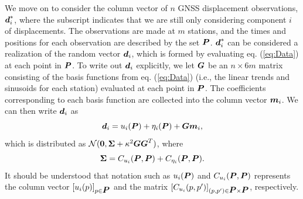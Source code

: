 \documentclass[extra,mreferee]{gji}
\begin{document}
We move on to consider the column vector of $n$ GNSS displacement observations, $\mitbf{d}^*_i$, where the subscript indicates that we are still only considering component $i$ of displacements. The observations are made at $m$ stations, and the times and positions for each observation are described by the set $\mitbf{P}$. $\mitbf{d}^*_i$ can be considered a realization of the random vector $\mitbf{d}_i$, which is formed by evaluating eq. (\ref{eq:Data}) at each point in $\mitbf{P}$. To write out $\mitbf{d}_i$ explicitly, we let $\mitbf{G}$ be an $n \times 6m$ matrix consisting of the basis functions from eq. (\ref{eq:Data}) (i.e., the linear trends and sinusoids for each station) evaluated at each point in $\mitbf{P}$. The coefficients corresponding to each basis function are collected into the column vector $\mitbf{m}_i$. We can then write $\mitbf{d}_i$ as 
\begin{equation}\label{eq:DataVec}
\mitbf{d}_i = u_i(\mitbf{P}) + \eta_i(\mitbf{P}) + \mitbf{G}\mitbf{m}_i,
\end{equation}
which is distributed as $\mathcal{N}(\mitbf{0},\mitbf{\Sigma} + \kappa^2\mitbf{G}\mitbf{G}^T)$, where
\begin{equation}\label{eq:Cd}
\mitbf{\Sigma} = C_{u_i}(\mitbf{P},\mitbf{P}) + C_{\eta_i}(\mitbf{P},\mitbf{P}).  
\end{equation}
It should be understood that notation such as $u_i(\mitbf{P})$ and $C_{u_i}(\mitbf{P},\mitbf{P})$ represents the column vector $[u_i(p)]_{p \in \mitbf{P}}$ and the matrix $[C_{u_i}(p,p')]_{(p,p') \in \mitbf{P} \times \mitbf{P}}$, respectively. 
\end{document}
